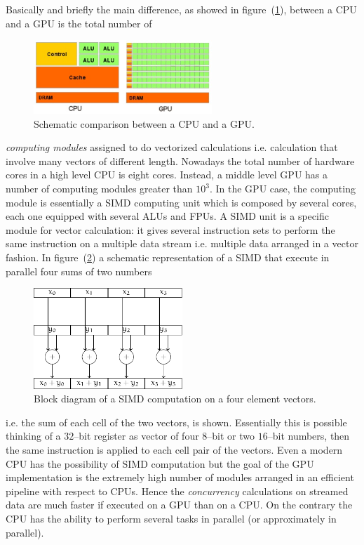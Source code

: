 Basically and briefly the main difference, as showed in figure~(\ref{fig:GPUvsCPU}), between a CPU and a GPU is 
the total number of 
\begin{figure}[h!t]
	\centering
	\includegraphics[width=0.6\textwidth]{./img/GPUvsCPU}
	\caption{Schematic comparison between a CPU and a GPU.}
	\label{fig:GPUvsCPU}
\end{figure}
\textit{computing modules} assigned to do vectorized calculations i.e. calculation that involve many vectors of 
different length. Nowadays the total number of hardware cores in a high level CPU is eight cores. Instead, a 
middle level GPU has a number of computing modules greater than $10^3$. In the GPU case, the computing 
module is essentially a \ac{SIMD} computing unit which is composed by several cores, each one equipped with 
several \acp{ALU} and \acp{FPU}. A \ac{SIMD} unit is a specific module for vector calculation: it gives several 
instruction sets to perform the same instruction on a multiple data stream i.e. multiple data arranged in a 
vector fashion. In figure~(\ref{fig:simd}) a schematic representation of a \ac{SIMD} that execute in parallel 
four sums of two numbers
\begin{figure}[h!t]
	\centering
	\includegraphics[width=0.5\textwidth]{./img//simd/simd.pdf}
	\caption{Block diagram of a \acs{SIMD} computation on a four element vectors.}
	\label{fig:simd}
\end{figure}
i.e. the sum of each cell of the two vectors, is shown. Essentially this is possible thinking of a $32$--bit 
register as vector of four $8$--bit or two $16$--bit numbers, then the same instruction is applied to each cell 
pair of the vectors. Even a modern CPU has the possibility of \ac{SIMD} computation but the goal of the GPU 
implementation is the extremely high number of modules arranged in an efficient pipeline with respect to CPUs. 
Hence the \textit{concurrency} calculations on streamed data are much faster if executed on a GPU than on a CPU. 
On the contrary the CPU has the ability to perform several tasks in parallel (or approximately in parallel).

